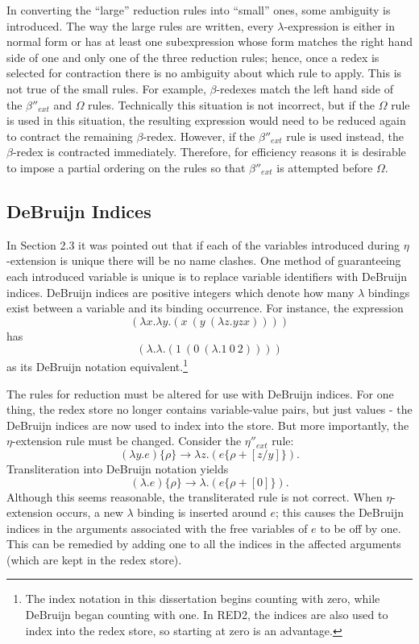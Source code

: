 In converting the ``large'' reduction rules into ``small'' ones, some ambiguity
is introduced. The way the large rules are written, every \(\lambda\)-expression
is either in normal form or has at least one subexpression whose form matches
the right hand side of one and only one of the three reduction rules; hence,
once a redex is selected for contraction there is no ambiguity about which rule
to apply. This is not true of the small rules. For example, \(\beta\)-redexes
match the left hand side of the \(\beta''_{ext}\) and \(\Omega\) rules.
Technically this situation is not incorrect, but if the \(\Omega\) rule is used
in this situation, the resulting expression would need to be reduced again to
contract the remaining \(\beta\)-redex. However, if the \(\beta''_{ext}\) rule
is used instead, the \(\beta\)-redex is contracted immediately. Therefore, for
efficiency reasons it is desirable to impose a partial ordering on the rules so
that \(\beta''_{ext}\) is attempted before \(\Omega\).

\subsection{DeBruijn Indices}

In Section 2.3 it was pointed out that if each of the variables introduced
during \(\eta\)-extension is unique there will be no name clashes. One method of
guaranteeing each introduced variable is unique is to replace variable
identifiers with DeBruijn indices. DeBruijn indices are positive integers which
denote how many \(\lambda\) bindings exist between a variable and its binding
occurrence. For instance, the expression
\[
(\lambda x.\lambda y.(x\ (y\ (\lambda z.yzx))))
\]
has
\[
(\lambda.\lambda.(1\ (0\ (\lambda.1\ 0\ 2))))
\]
as its DeBruijn notation equivalent.\footnote{The index notation in this
dissertation begins counting with zero, while DeBruijn began counting with one.
In RED2, the indices are also used to index into the redex store, so starting at
zero is an advantage.}

The rules for reduction must be altered for use with DeBruijn indices. For one
thing, the redex store no longer contains variable-value pairs, but just values
- the DeBruijn indices are now used to index into the store. But more
importantly, the \(\eta\)-extension rule must be changed. Consider the
\(\eta''_{ext}\) rule:
\[
(\lambda y.e)\{\rho\}\longrightarrow \lambda z.(e\{\rho+[z/y]\}).
\]
Transliteration into DeBruijn notation yields
\[
(\lambda.e)\{\rho\}\longrightarrow \lambda.(e\{\rho+[0]\}).
\]
Although this seems reasonable, the transliterated rule is not correct. When
\(\eta\)-extension occurs, a new \(\lambda\) binding is inserted around \(e\);
this causes the DeBruijn indices in the arguments associated with the free
variables of \(e\) to be off by one. This can be remedied by adding one to all
the indices in the affected arguments (which are kept in the redex store).

